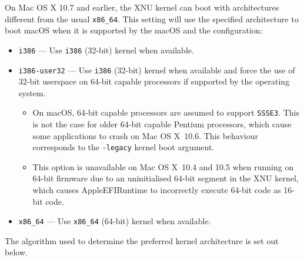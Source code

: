 \documentclass[]{article}
\providecommand{\tightlist}{%
  \setlength{\itemsep}{0pt}\setlength{\parskip}{0pt}}
\begin{document}
\begin{enumerate}
  On Mac OS X 10.7 and earlier, the XNU kernel can boot with architectures different from
  the usual \texttt{x86\_64}. This setting will use the specified architecture to boot
  macOS when it is supported by the macOS and the configuration:

  \begin{itemize}
    \tightlist
    \item \texttt{i386} --- Use \texttt{i386} (32-bit) kernel when available.
    \item \texttt{i386-user32} --- Use \texttt{i386} (32-bit) kernel when available
      and force the use of 32-bit userspace on 64-bit capable processors if supported
      by the operating system.
      \begin{itemize}
        \tightlist
        \item On macOS, 64-bit capable processors are assumed to
          support \texttt{SSSE3}. This is not the case for older 64-bit capable Pentium
          processors, which cause some applications to crash on Mac OS X~10.6. This behaviour
          corresponds to the \texttt{-legacy} kernel boot argument.
        \item This option is unavailable on Mac OS X~10.4 and 10.5 when running on 64-bit firmware
          due to an uninitialised 64-bit segment in the XNU kernel, which causes AppleEFIRuntime
          to incorrectly execute 64-bit code as 16-bit code.
      \end{itemize}
    \item \texttt{x86\_64} --- Use \texttt{x86\_64} (64-bit) kernel when available.
  \end{itemize}

  The algorithm used to determine the preferred kernel architecture is set out below.


\end{enumerate}
\end{document}
